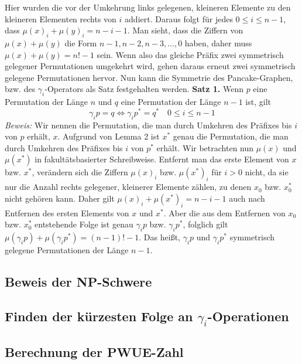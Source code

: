 \documentclass[a4paper, 11pt, ngerman]{article}
\begin{document}
Hier wurden die vor der Umkehrung links gelegenen, kleineren Elemente zu den kleineren Elementen rechts von $i$ addiert. Daraus folgt für jedes $0 \le i \le n - 1$, dass $\mu(x)_i + \mu(y)_i = n - i-1$. Man sieht, dass die Ziffern von $\mu(x) + \mu(y)$ die Form $n-1, n-2, n-3, \dots, 0$ haben, daher muss $\mu(x) + \mu(y) = n! - 1$ sein. Wenn also das gleiche Präfix zwei symmetrisch gelegener Permutationen umgekehrt wird, gehen daraus erneut zwei symmetrisch gelegene Permutationen hervor.
\newline \newline
Nun kann die Symmetrie des Pancake-Graphen, bzw. des $\gamma_i$-Operators als Satz festgehalten werden.
\newline \newline
\textbf{Satz 1.} Wenn $p$ eine Permutation der Länge $n$ und $q$ eine Permutation der Länge $n - 1$ ist, gilt
$$
    \gamma_i p = q \Longleftrightarrow \gamma_i p^* = q^* \quad 0 \le i \le n - 1
$$
\newline \newline
\emph{Beweis:} Wir nennen die Permutation, die man durch Umkehren des Präfixes bis $i$ von $p$ erhält, $x$. Aufgrund von Lemma 2 ist $x^*$ genau die Permutation, die man durch Umkehren des Präfixes bis $i$ von $p^*$ erhält. Wir betrachten nun $\mu(x)$ und $\mu(x^*)$ in fakultätsbasierter Schreibweise. Entfernt man das erste Element von $x$ bzw. $x^*$, verändern sich die Ziffern $\mu(x)_i$ bzw. $\mu(x^*)_i$ für $i > 0$ nicht, da sie nur die Anzahl rechts gelegener, kleinerer Elemente zählen, zu denen $x_0$ bzw. $x^*_0$ nicht gehören kann. Daher gilt $\mu(x)_i + \mu(x^*)_i = n - i - 1$ auch nach Entfernen des ersten Elements von $x$ und $x^*$. Aber die aus dem Entfernen von $x_0$ bzw. $x^*_0$ entstehende Folge ist genau $\gamma_i p$ bzw. $\gamma_i p^*$, folglich gilt $\mu(\gamma_i p) + \mu(\gamma_i p^*) = (n - 1)! - 1$. Das heißt, $\gamma_i p$ und $\gamma_i p^*$ symmetrisch gelegene Permutationen der Länge $n - 1$.

\subsection{Beweis der NP-Schwere}

\subsection{Finden der kürzesten Folge an $\gamma_i$-Operationen}

\subsection{Berechnung der PWUE-Zahl}
\end{document}
